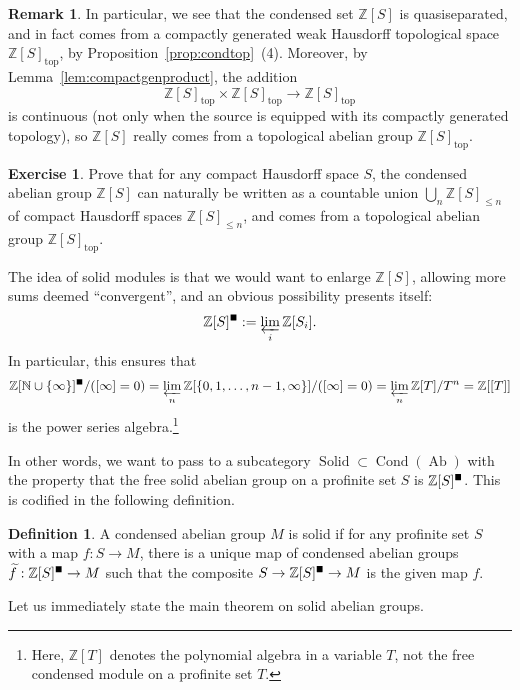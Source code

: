 \documentclass[11pt]{amsbook}
\DeclareMathOperator{\Cond}{Cond}
\DeclareMathOperator{\Ab}{Ab}
\newcommand{\solid}{{\mathsmaller{\blacksquare}}}
\DeclareMathOperator{\Solid}{Solid}
\renewcommand*{\tilde}{\widetilde}
\numberwithin{equation}{section}
\numberwithin{theorem}{section}
\theoremstyle{definition}
\newtheorem{remark}[theorem]{Remark}
\newtheorem{exercise}[theorem]{Exercise}
\newtheorem{definition}[theorem]{Definition}
\begin{document}
\begin{remark} In particular, we see that the condensed set $\mathbb Z[S]$ is quasiseparated, and in fact comes from a compactly generated weak Hausdorff topological space $\mathbb Z[S]_{\mathrm{top}}$, by Proposition~\ref{prop:condtop}~(4). Moreover, by Lemma~\ref{lem:compactgenproduct}, the addition
\[
\mathbb Z[S]_{\mathrm{top}}\times \mathbb Z[S]_{\mathrm{top}}\to \mathbb Z[S]_{\mathrm{top}}
\]
is continuous (not only when the source is equipped with its compactly generated topology), so $\mathbb Z[S]$ really comes from a topological abelian group $\mathbb Z[S]_{\mathrm{top}}$.
\end{remark}

\begin{exercise} Prove that for any compact Hausdorff space $S$, the condensed abelian group $\mathbb Z[S]$ can naturally be written as a countable union $\bigcup_n \mathbb Z[S]_{\leq n}$ of compact Hausdorff spaces $\mathbb Z[S]_{\leq n}$, and comes from a topological abelian group $\mathbb Z[S]_{\mathrm{top}}$.
\end{exercise}

The idea of solid modules is that we would want to enlarge $\mathbb Z[S]$, allowing more sums deemed ``convergent'', and an obvious possibility presents itself:
\[
\mathbb Z[S]^\solid := \varprojlim_i \mathbb Z[S_i] .
\]
In particular, this ensures that
\[
\mathbb Z[\mathbb N\cup\{\infty\}]^\solid/([\infty]=0) = \varprojlim_n \mathbb Z[\{0,1,\ldots,n-1,\infty\}]/([\infty]=0) = \varprojlim_n \mathbb Z[T]/T^n = \mathbb Z[[T]]
\]
is the power series algebra.\footnote{Here, $\mathbb Z[T]$ denotes the polynomial algebra in a variable $T$, not the free condensed module on a profinite set $T$.}

In other words, we want to pass to a subcategory $\Solid\subset \Cond(\Ab)$ with the property that the free solid abelian group on a profinite set $S$ is $\mathbb Z[S]^\solid$. This is codified in the following definition.

\begin{definition}\label{def:solid} A condensed abelian group $M$ is solid if for any profinite set $S$ with a map $f: S\to M$, there is a unique map of condensed abelian groups $\tilde{f}: \mathbb Z[S]^\solid\to M$ such that the composite $S\to \mathbb Z[S]^\solid\to M$ is the given map $f$.
\end{definition}

Let us immediately state the main theorem on solid abelian groups.
\end{document}
